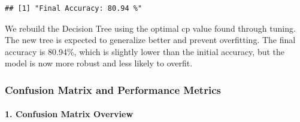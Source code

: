 \documentclass[
]{article}
\newenvironment{Shaded}{\begin{snugshade}}{\end{snugshade}}
\newcommand{\DecValTok}[1]{\textcolor[rgb]{0.00,0.00,0.81}{#1}}
\newcommand{\FunctionTok}[1]{\textcolor[rgb]{0.13,0.29,0.53}{\textbf{#1}}}
\newcommand{\NormalTok}[1]{#1}
\newcommand{\OtherTok}[1]{\textcolor[rgb]{0.56,0.35,0.01}{#1}}
\newcommand{\SpecialCharTok}[1]{\textcolor[rgb]{0.81,0.36,0.00}{\textbf{#1}}}
\newcommand{\StringTok}[1]{\textcolor[rgb]{0.31,0.60,0.02}{#1}}
\begin{document}
\begin{Shaded}
\end{Shaded}

\begin{verbatim}
## [1] "Final Accuracy: 80.94 %"
\end{verbatim}

We rebuild the Decision Tree using the optimal cp value found through
tuning. The new tree is expected to generalize better and prevent
overfitting. The final accuracy is 80.94\%, which is slightly lower than
the initial accuracy, but the model is now more robust and less likely
to overfit.

\hypertarget{confusion-matrix-and-performance-metrics}{%
\subsubsection{Confusion Matrix and Performance
Metrics}\label{confusion-matrix-and-performance-metrics}}

\hypertarget{confusion-matrix-overview-1}{%
\paragraph{\texorpdfstring{1. \textbf{Confusion Matrix
Overview}}{1. Confusion Matrix Overview}}\label{confusion-matrix-overview-1}}
\end{document}
